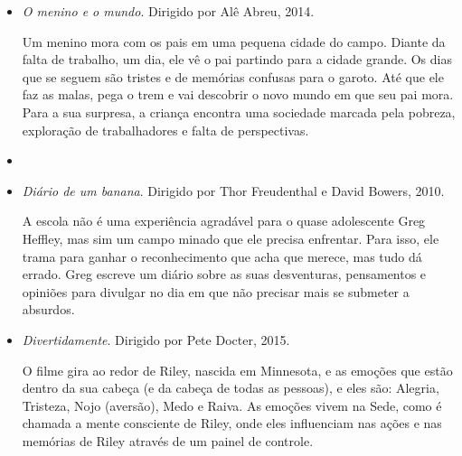 \documentclass[11pt]{extarticle}
\begin{document}
\begin{itemize}
\item \textit{O menino e o mundo}. Dirigido por Alê Abreu, 2014.

Um menino mora com os pais em uma pequena cidade do campo. Diante da falta de trabalho, um dia, ele vê o pai partindo para a cidade grande. Os dias que se seguem são tristes e de memórias confusas para o garoto. Até que ele faz as malas, pega o trem e vai descobrir o novo mundo em que seu pai mora. Para a sua surpresa, a criança encontra uma sociedade marcada pela pobreza, exploração de trabalhadores e falta de perspectivas.

\item \item \textit{Diário de um banana}. Dirigido por Thor Freudenthal e David Bowers, 2010. 

A escola não é uma experiência agradável para o quase adolescente Greg Heffley, mas sim um campo minado que ele precisa enfrentar. Para isso, ele trama para ganhar o reconhecimento que acha que merece, mas tudo dá errado. Greg escreve um diário sobre as suas desventuras, pensamentos e opiniões para divulgar no dia em que não precisar mais se submeter a absurdos.

\item \textit{Divertidamente}. Dirigido por Pete Docter, 2015.

O filme gira ao redor de Riley, nascida em Minnesota, e as emoções que estão dentro da sua cabeça (e da cabeça de todas as pessoas), e eles são: Alegria, Tristeza, Nojo (aversão), Medo e Raiva. As emoções vivem na Sede, como é chamada a mente consciente de Riley, onde eles influenciam nas ações e nas memórias de Riley através de um painel de controle.

\end{itemize}
\end{document}
